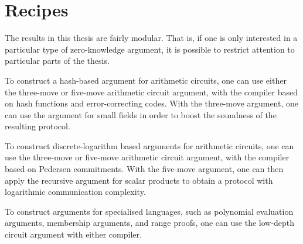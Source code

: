 %

\section{Recipes} The results in this thesis are fairly modular. That is, if one is only interested in a particular type of zero-knowledge argument, it is possible to restrict attention to particular parts of the thesis.

To construct a hash-based argument for arithmetic circuits, one can use either the three-move or five-move arithmetic circuit argument, with the compiler based on hash functions and error-correcting codes. With the three-move argument, one can use the argument for small fields in order to boost the soundness of the resulting protocol.

To construct discrete-logarithm based arguments for arithmetic circuits, one can use the three-move or five-move arithmetic circuit argument, with the compiler based on Pedersen commitments. With the five-move argument, one can then apply the recursive argument for scalar products to obtain a protocol with logarithmic communication complexity.

To construct arguments for specialised languages, such as polynomial evaluation arguments, membership arguments, and range proofs, one can use the low-depth circuit argument with either compiler.